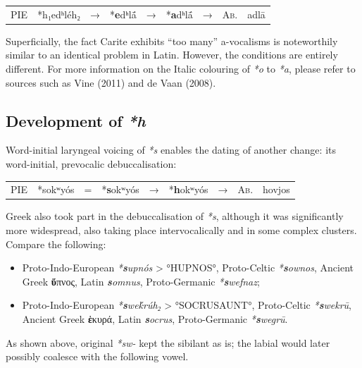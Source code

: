 \documentclass[svgnames,x11names,b5paper]{book}
\begin{document}
            \begin{table}[H]
                \begin{center}
                \begin{tabular}{llcllllll}
                \textsc{PIE} & *h₁edʰléh₂ & → & *\textbf{e}dʰlā́ & → & *\textbf{a}dʰlā́ & → & \textsc{Ab.} & adlā\\
                \end{tabular}
                \end{center}
                \end{table}
        
            Superficially, the fact Carite exhibits “too many” a-vocalisms is noteworthily similar to an identical problem in Latin. However, the conditions are entirely different. For more information on the Italic colouring of \textit{*o} to \textit{*a}, please refer to sources such as Vine (2011) and de Vaan (2008).

            \subsection{Development of \textit{*h}}
        
        Word-initial laryngeal voicing of \textit{*s} enables the dating of another change: its word-initial, prevocalic debuccalisation:

            \begin{table}[H]
                \begin{center}
                \begin{tabular}{llcllllll}
                \textsc{PIE} & *sokʷyós & = & *\textbf{s}okʷyós & → & *\textbf{h}okʷyós & → & \textsc{Ab.} & hovjos\\
                \end{tabular}
                \end{center}
                \end{table}
        
            Greek also took part in the debuccalisation of \textit{*s}, although it was significantly more widespread, also taking place intervocalically and in some complex clusters. Compare the following:
\begin{itemize}
\item  Proto-Indo-European \textit{*\textbf{s}upnós} > °HUPNOS°, Proto-Celtic \textit{*\textbf{s}ownos}, Ancient Greek \textbf{ὕ}πνος, Latin \textit{\textbf{s}omnus}, Proto-Germanic \textit{*\textbf{s}wefnaz};\\
\item  Proto-Indo-European \textit{*\textbf{s}weḱrúh₂} > °SOCRUSAUNT°, Proto-Celtic \textit{*\textbf{s}wekrū}, Ancient Greek \textbf{ἑ}κυρά, Latin \textit{\textbf{s}ocrus}, Proto-Germanic \textit{*\textbf{s}wegrū}.\\
\end{itemize}
As shown above, original \textit{*sw-} kept the sibilant as is; the labial would later possibly coalesce with the following vowel.
\end{document}
